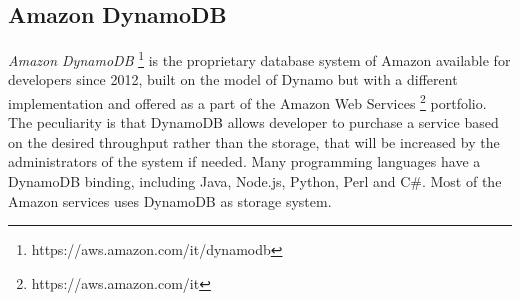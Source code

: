 \subsection{Amazon DynamoDB}
\textit{Amazon DynamoDB} \footnote{https://aws.amazon.com/it/dynamodb} is the proprietary database system of Amazon available for developers since 2012, built on the model of Dynamo but with a different implementation and offered as a part of the Amazon Web Services \footnote{https://aws.amazon.com/it} portfolio. The peculiarity is that DynamoDB allows developer to purchase a service based on the desired throughput rather than the storage, that will be increased by the administrators of the system if needed.
Many programming languages have a DynamoDB binding, including Java, Node.js, Python, Perl and C\#.
Most of the Amazon services uses DynamoDB as storage system.


